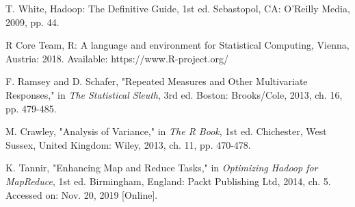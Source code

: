 \documentclass[journal]{IEEEtran}
\begin{document}
\begin{thebibliography}{1}
T. White, Hadoop: The Definitive Guide, 1st ed. Sebastopol,
 CA: O'Reilly Media, 2009, pp. 44.

R Core Team, R: A language and environment for Statistical Computing, Vienna, Austria: 2018.
 Available: https://www.R-project.org/
 
F. Ramsey and D. Schafer, "Repeated Measures and Other Multivariate Responses," 
 in \textit{The Statistical Sleuth}, 3rd ed. Boston: Brooks/Cole, 2013,
 ch. 16, pp. 479-485.  

M. Crawley, "Analysis of Variance," in \textit{The R Book},
 1st ed. Chichester, West Sussex, United Kingdom: Wiley, 2013,
 ch. 11, pp. 470-478.

K. Tannir, "Enhancing Map and Reduce Tasks," in 
 \textit{Optimizing Hadoop for MapReduce},
 1st ed. Birmingham, England: Packt Publishing Ltd, 2014,
 ch. 5. Accessed on: Nov. 20, 2019 [Online]. 

\end{thebibliography}


\end{document}
